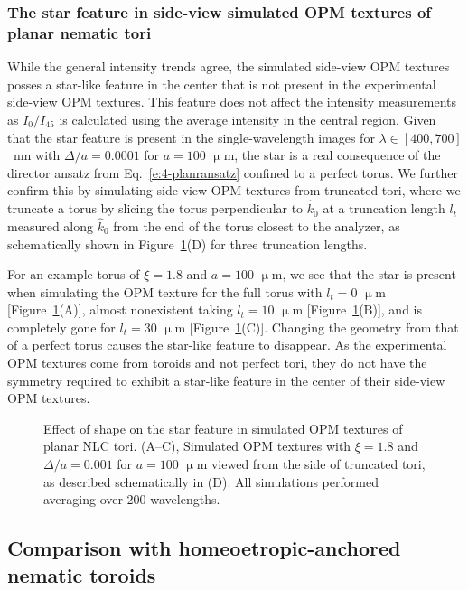 \subsubsection{The star feature in side-view simulated OPM textures of planar nematic tori}
While the general intensity trends agree, the simulated side-view OPM textures posses a star-like feature in the center that is not present in the experimental side-view OPM textures.
This feature does not affect the intensity measurements as $I_0/I_{45}$ is calculated using the average intensity in the central region.
Given that the star feature is present in the single-wavelength images for $\lambda \in [400,700]$~nm with $\Delta/a = 0.0001$ for $a = 100$ $\upmu$m, the star is a real consequence of the director ansatz from Eq.~\ref{e:4-planransatz} confined to a perfect torus.
We further confirm this by simulating side-view OPM textures from truncated tori, where we truncate a torus by slicing the torus perpendicular to $\hat{k}_0$ at a truncation length $l_t$ measured along $\hat{k}_0$ from the end of the torus closest to the analyzer, as schematically shown in Figure~\ref{f:4-nostar}(D) for three truncation lengths.

For an example torus of $\xi=1.8$ and $a = 100$ $\upmu$m, we see that the star is present when simulating the OPM texture for the full torus with $l_t=0$ $\upmu$m [Figure~\ref{f:4-nostar}(A)], almost nonexistent taking $l_t=10$ $\upmu$m [Figure~\ref{f:4-nostar}(B)], and is completely gone for $l_t=30$ $\upmu$m [Figure~\ref{f:4-nostar}(C)].
Changing the geometry from that of a perfect torus causes the star-like feature to disappear.
As the experimental OPM textures come from toroids and not perfect tori, they do not have the symmetry required to exhibit a star-like feature in the center of their side-view OPM textures.
\begin{figure}
\centering
\caption{Effect of shape on the star feature in simulated OPM textures of planar NLC tori.
(A--C), Simulated OPM textures with $\xi = 1.8$ and $\Delta /a = 0.001$ for $a = 100$ $\upmu$m viewed from the side of truncated tori, as described schematically in (D).
All simulations performed averaging over 200 wavelengths.}\label{f:4-nostar}
\end{figure}


\subsection{Comparison with homeoetropic-anchored nematic toroids}
